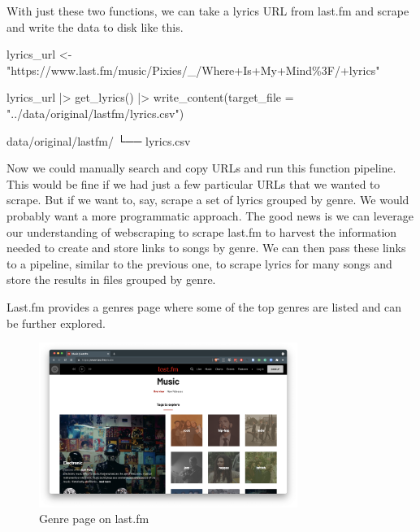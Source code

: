 \documentclass[
  letterpaper,
]{latex/krantz}
\newenvironment{Shaded}{\begin{snugshade}}{\end{snugshade}}
\newcommand{\AttributeTok}[1]{\textcolor[rgb]{0.00,0.00,0.00}{#1}}
\newcommand{\ExtensionTok}[1]{\textcolor[rgb]{0.00,0.00,0.00}{#1}}
\newcommand{\FunctionTok}[1]{\textcolor[rgb]{0.00,0.00,0.00}{#1}}
\newcommand{\NormalTok}[1]{\textcolor[rgb]{0.00,0.00,0.00}{#1}}
\newcommand{\OtherTok}[1]{\textcolor[rgb]{0.00,0.00,0.00}{#1}}
\newcommand{\SpecialCharTok}[1]{\textcolor[rgb]{0.00,0.00,0.00}{#1}}
\newcommand{\StringTok}[1]{\textcolor[rgb]{0.00,0.00,0.00}{#1}}
\begin{document}
With just these two functions, we can take a lyrics URL from last.fm and
scrape and write the data to disk like this.

\begin{Shaded}
\begin{Highlighting}[]
\NormalTok{lyrics\_url }\OtherTok{\textless{}{-}} \StringTok{"https://www.last.fm/music/Pixies/\_/Where+Is+My+Mind\%3F/+lyrics"}

\NormalTok{lyrics\_url }\SpecialCharTok{|\textgreater{}} 
  \FunctionTok{get\_lyrics}\NormalTok{() }\SpecialCharTok{|\textgreater{}} 
  \FunctionTok{write\_content}\NormalTok{(}\AttributeTok{target\_file =} \StringTok{"../data/original/lastfm/lyrics.csv"}\NormalTok{)}
\end{Highlighting}
\end{Shaded}

\begin{Shaded}
\begin{Highlighting}[]
\ExtensionTok{data/original/lastfm/}
\ExtensionTok{└──}\NormalTok{ lyrics.csv}
\end{Highlighting}
\end{Shaded}

Now we could manually search and copy URLs and run this function
pipeline. This would be fine if we had just a few particular URLs that
we wanted to scrape. But if we want to, say, scrape a set of lyrics
grouped by genre. We would probably want a more programmatic approach.
The good news is we can leverage our understanding of webscraping to
scrape last.fm to harvest the information needed to create and store
links to songs by genre. We can then pass these links to a pipeline,
similar to the previous one, to scrape lyrics for many songs and store
the results in files grouped by genre.

Last.fm provides a genres page where some of the top genres are listed
and can be further explored.

\begin{figure}[h]

{\centering \includegraphics[width=0.75\textwidth,height=\textheight]{figures/acquire-data/ad-lastfm-genres.png}

}

\caption{\label{fig-ad-genre-page-lastfm}Genre page on last.fm}

\end{figure}
\end{document}
